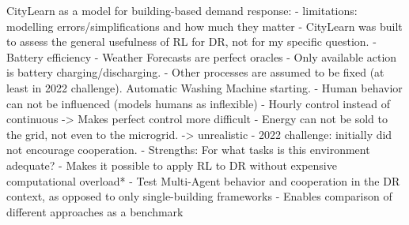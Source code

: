 CityLearn as a model for building-based demand response:
- limitations: modelling errors/simplifications and how much they matter
    - CityLearn was built to assess the general usefulness of RL for DR, not for my specific question.
    - Battery efficiency
    - Weather Forecasts are perfect oracles
    - Only available action is battery charging/discharging.
    - Other processes are assumed to be fixed (at least in 2022 challenge). Automatic Washing Machine starting.
    - Human behavior can not be influenced (models humans as inflexible)
    - Hourly control instead of continuous -> Makes perfect control more difficult
    - Energy can not be sold to the grid, not even to the microgrid. -> unrealistic
    - 2022 challenge: initially did not encourage cooperation.
- Strengths: For what tasks is this environment adequate?
    - Makes it possible to apply RL to DR without expensive computational overload*
    - Test Multi-Agent behavior and cooperation in the DR context, as opposed to only single-building frameworks
    - Enables comparison of different approaches as a benchmark